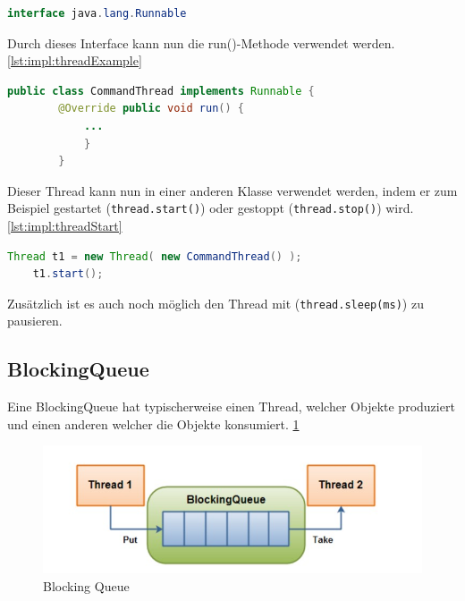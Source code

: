 \begin{lstlisting}[language=java,caption=Java Runnable,label=lst:impl:javaRunnable]
    interface java.lang.Runnable
\end{lstlisting}

Durch dieses Interface kann nun die run()-Methode verwendet werden. \ref{lst:impl:threadExample}

\begin{lstlisting}[language=java,caption=Einfaches Thread Beispiel,label=lst:impl:threadExample]
    public class CommandThread implements Runnable {  
        @Override public void run() {    
            ...
            }
        }
\end{lstlisting}

Dieser Thread kann nun in einer anderen Klasse verwendet werden, indem er zum Beispiel gestartet (\texttt{thread.start()}) oder gestoppt (\texttt{thread.stop()}) wird. \ref{lst:impl:threadStart}

\begin{lstlisting}[language=java,caption=Thread erstellen/starten,label=lst:impl:threadStart]
    Thread t1 = new Thread( new CommandThread() );
    t1.start();
\end{lstlisting}

Zusätzlich ist es auch noch möglich den Thread mit (\texttt{thread.sleep(ms)}) zu pausieren.

\subsection{BlockingQueue}

Eine BlockingQueue hat typischerweise einen Thread, welcher Objekte produziert und einen anderen welcher die Objekte konsumiert. \ref{fig:impl:BlockingQueue}

\begin{figure}[h t]
    \centering
    \includegraphics[scale=0.5]{pics/blockingQueue.jpg}
    \caption{Blocking Queue}
    \label{fig:impl:BlockingQueue}
\end{figure}

